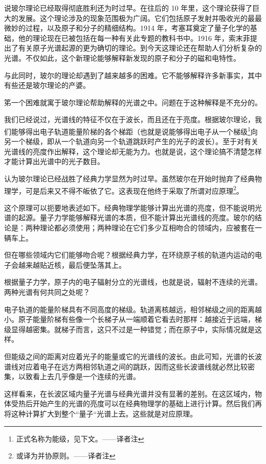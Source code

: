 说玻尔理论已经取得彻底胜利还为时过早。在往后的 10 年里，这个理论获得了巨大的发展。这个理论涉及的现象范围极为广阔。它们包括原子发射并吸收光的最最微妙的过程，以及原子和分子的精细结构。1914 年，考塞耳奠定了量子化学的基础，他的理论现在已被包括在每一种有关此专题的教科书中。1916 年，索末菲提出了有关原子光谱起源的更为确切的理论。到今天这理论还在帮助人们分析复杂的光谱。不仅如此，这个新理论能够解释新发现的原子和分子的磁和电特性。

与此同时，玻尔的理论却遇到了越来越多的困难。它不能够解释许多新事实，其中有些还是玻尔理论的产婆。

笫一个困难就寓于玻尔理论帮助解释的光谱之中。问题在于这种解释是不充分的。

我们已经说过，光谱线的特征不仅在于波长，而且还在于亮度。根据玻尔理论，我们能够得出电子轨道能量阶梯的各个梯距（也就是说能够得出电子从一个梯级\footnote{正式名称为能级，见下文。——译者注}向另一个梯级，即从一个轨道向另一个轨道跳跃时产生的光子的波长）。至于对有关光谱线的亮度作出解释，这个理论却无能为力。也就是说，这个理论搞不清楚怎样才能计算出光谱中的光子数目。

认为玻尔理论已经战胜了经典力学显然为时过早。虽然玻尔在开始时抛弃了经典物理学，可是后来又不得不皈依了它。这表现在他终于采取了所谓对应原理\footnote{或译为并协原则。——译者注}。

这个原理可以扼要地表述如下。经典物理学能够计算出光谱的亮度，但不能说明光谱的起源。量子力学能够解释光谱的本质，但不能计算出光谱线的亮度。玻尔的结论是：两种理论都必须使用；两种理论在它们多少互相吻合的领域内，应被套在一辆车上。

但在哪些领域内它们能够吻合呢？根据经典力学，在环绕原子核的轨道内运动的电子会越来越贴近核，最后便坠落其上。

根据量子力学，原子内的电子辐射分立的光谱线，也就是说，辐射不连续的光谱。两种光谱有何共同之处呢？

电子轨道的能量阶梯具有不同高度的梯级。轨道离核越远，相邻梯级之间的距离越小。原子能量阶梯有些像一个长梯子从一端顺着它看去时那样：越接近于远端，梯级显得越密集。就梯子而言，这只不过是一种错觉；而在原子中，实际情况就是这样。

但能级之间的距离对应着光子的能量或它的光谱线的波长。由此可知，光谱的长波谱线对应着电子在远方两相邻轨道之间的跳跃，因而这些长波谱线就必然比较密集，以致看上去几乎像是一个连续的光谱。

这样看来，在长波区域内量子光谱与经典光谱并没有显著的差别。在这区域内，物体受热后开始产生的光谱的亮度可以在经典物理学的基础上进行计算。然后我们再将这种计算扩大到整个“量子“光谱上去。这些就是对应原理。

